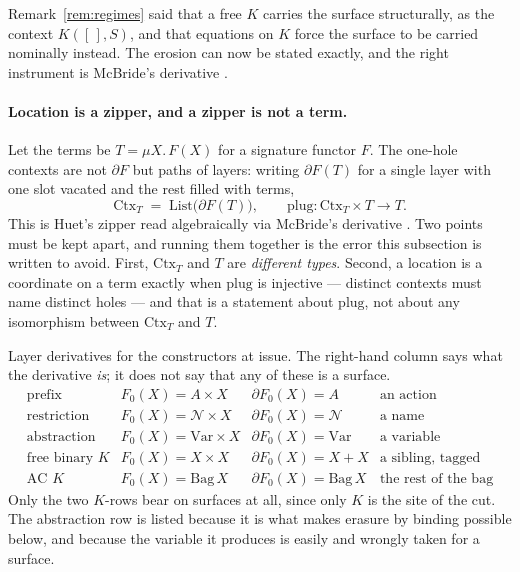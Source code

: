 \documentclass[11pt,a4paper]{article}
\theoremstyle{definition}
\theoremstyle{plain}
\theoremstyle{remark}
\newcommand{\Ctx}{\mathrm{Ctx}}
\begin{document}
Remark~\ref{rem:regimes} said that a free $K$ carries the surface structurally, as
the context $K([\,],S)$, and that equations on $K$ force the surface to be carried
nominally instead. The erosion can now be stated exactly, and the right instrument is
McBride's derivative \cite{mcbride}.

\paragraph{Location is a zipper, and a zipper is not a term.}
Let the terms be $T = \mu X.\,F(X)$ for a signature functor $F$. The one-hole
contexts are not $\partial F$ but paths of layers: writing $\partial F(T)$ for a
single layer with one slot vacated and the rest filled with terms,
\[
\Ctx_T \;=\; \mathrm{List}\bigl(\partial F(T)\bigr),
\qquad
\mathrm{plug} : \Ctx_T \times T \to T .
\]
This is Huet's zipper \cite{huet} read algebraically via McBride's derivative
\cite{mcbride}. Two points must be kept apart, and running them together is the error
this subsection is written to avoid. First, $\Ctx_T$ and $T$ are \emph{different
types}. Second, a location is a coordinate on a term exactly when $\mathrm{plug}$ is
injective --- distinct contexts must name distinct holes --- and that is a statement
about $\mathrm{plug}$, not about any isomorphism between $\Ctx_T$ and $T$.

Layer derivatives for the constructors at issue. The right-hand column says what the
derivative \emph{is}; it does not say that any of these is a surface.
\[
\begin{array}{llll}
\text{prefix} & F_0(X) = A \times X & \partial F_0(X) = A & \text{an action}\\
\text{restriction} & F_0(X) = \mathcal{N} \times X & \partial F_0(X) = \mathcal{N} & \text{a name}\\
\text{abstraction} & F_0(X) = \mathrm{Var} \times X & \partial F_0(X) = \mathrm{Var} & \text{a variable}\\
\text{free binary }K & F_0(X) = X \times X & \partial F_0(X) = X + X & \text{a sibling, tagged}\\
\text{AC }K & F_0(X) = \mathrm{Bag}\,X & \partial F_0(X) = \mathrm{Bag}\,X & \text{the rest of the bag}
\end{array}
\]
Only the two $K$-rows bear on surfaces at all, since only $K$ is the site of the cut.
The abstraction row is listed because it is what makes erasure by binding possible
below, and because the variable it produces is easily and wrongly taken for a
surface.
\end{document}
